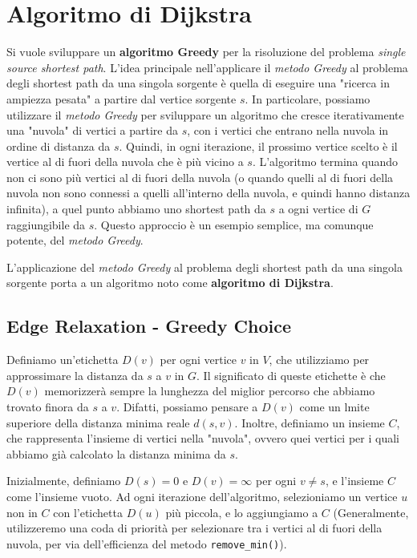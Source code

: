 \clearpage
\section{Algoritmo di Dijkstra}
Si vuole sviluppare un \textbf{algoritmo Greedy} per la risoluzione del problema \emph{single source shortest path}. L'idea principale nell'applicare il \emph{metodo Greedy} al problema degli shortest path da una singola sorgente è quella di eseguire una "ricerca in ampiezza pesata" a partire dal vertice sorgente $s$. In particolare, possiamo utilizzare il \emph{metodo Greedy} per sviluppare un algoritmo che cresce iterativamente una "nuvola" di vertici a partire da $s$, con i vertici che entrano nella nuvola in ordine di distanza da $s$. Quindi, in ogni iterazione, il prossimo vertice scelto è il vertice al di fuori della nuvola che è più vicino a $s$. L'algoritmo termina quando non ci sono più vertici al di fuori della nuvola (o quando quelli al di fuori della nuvola non sono connessi a quelli all'interno della nuvola, e quindi hanno distanza infinita), a quel punto abbiamo uno shortest path da $s$ a ogni vertice di $G$ raggiungibile da $s$. Questo approccio è un esempio semplice, ma comunque potente, del \emph{metodo Greedy}. 

L'applicazione del \emph{metodo Greedy} al problema degli shortest path da una singola sorgente porta a un algoritmo noto come \textbf{algoritmo di Dijkstra}.


\subsection{Edge Relaxation - Greedy Choice}
Definiamo un'etichetta $D(v)$ per ogni vertice $v$ in $V$, che utilizziamo per approssimare la distanza da $s$ a $v$ in $G$. Il significato di queste etichette è che $D(v)$ memorizzerà sempre la lunghezza del miglior percorso che abbiamo trovato finora da $s$ a $v$. Difatti, possiamo pensare a $D(v)$ come un lmite superiore della distanza minima reale $d(s,v)$. Inoltre, definiamo un insieme $C$, che rappresenta l'insieme di vertici nella "nuvola", ovvero quei vertici per i quali abbiamo già calcolato la distanza minima da $s$.

Inizialmente, definiamo $D(s) = 0$ e $D(v) = \infty$ per ogni $v \neq s$, e l'insieme $C$ come l'insieme vuoto. Ad ogni iterazione dell'algoritmo, selezioniamo un vertice $u$ non in $C$ con l'etichetta $D(u)$ più piccola, e lo aggiungiamo a $C$ (Generalmente, utilizzeremo una coda di priorità per selezionare tra i vertici al di fuori della nuvola, per via dell'efficienza del metodo \texttt{remove\_min()}). 

